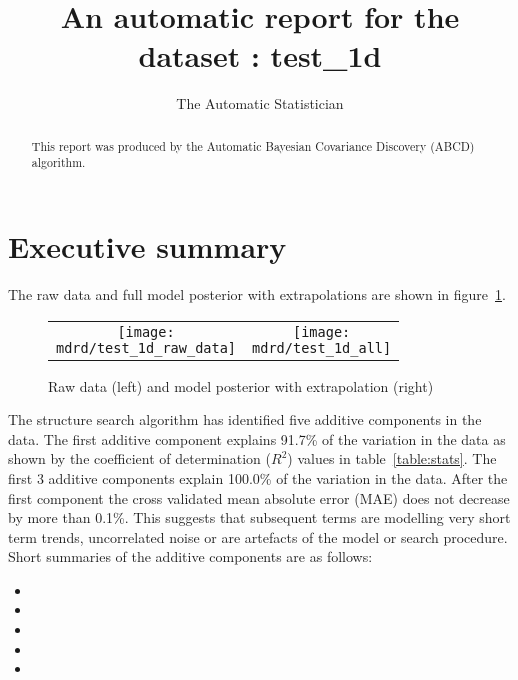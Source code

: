 \documentclass{article} %
\title{An automatic report for the dataset : test_1d}
\author{
The Automatic Statistician
}
\begin{document}
\allowdisplaybreaks

\maketitle

\begin{abstract}
This report was produced by the Automatic Bayesian Covariance Discovery (ABCD) algorithm.
\end{abstract}

\section{Executive summary}

The raw data and full model posterior with extrapolations are shown in figure~\ref{fig:rawandfit}.

\begin{figure}[H]
\newcommand{\wmgd}{0.5\columnwidth}
\newcommand{\hmgd}{3.0cm}
\newcommand{\mdrd}{test_1d}
\newcommand{\mbm}{\hspace{-0.3cm}}
\begin{tabular}{cc}
\mbm \texttt{[image: \\mdrd/test\_1d\_raw\_data]} & \texttt{[image: \\mdrd/test\_1d\_all]}
\end{tabular}
\caption{Raw data (left) and model posterior with extrapolation (right)}
\label{fig:rawandfit}
\end{figure}

The structure search algorithm has identified five additive components in the data.
The  first additive component explains 91.7\% of the variation in the data as shown by the coefficient of determination ($R^2$) values in table~\ref{table:stats}.
The  first 3 additive components explain 100.0\% of the variation in the data.
After the first component the cross validated mean absolute error (MAE) does not decrease by more than 0.1\%.
This suggests that subsequent terms are modelling very short term trends, uncorrelated noise or are artefacts of the model or search procedure.
Short summaries of the additive components are as follows:
\begin{itemize}

  \item  

  \item  

  \item  

  \item  

  \item  

\end{itemize}
\end{document}
